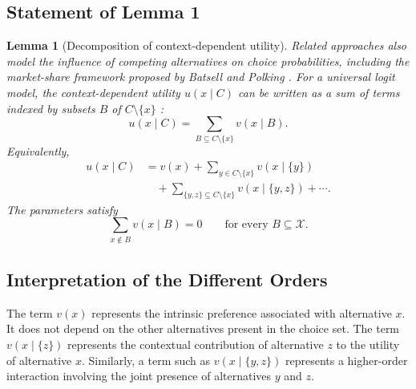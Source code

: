 \documentclass[12pt,oneside]{report}
\newtheorem{lemma}[definition]{Lemma}
\newcommand{\X}{\mathcal{X}}
\begin{document}
\subsection{Statement of Lemma 1}
\begin{lemma}[Decomposition of context-dependent utility]Related approaches also model the influence of competing
alternatives on choice probabilities, including the
market-share framework proposed by Batsell and Polking
\citep{batsell1985}.
For a universal logit model, the context-dependent utility $u(x\mid C)$ can
be written as a sum of terms indexed by subsets $B$ of
$C\setminus\{x\}$ \citep{seshadri2019}:
\begin{equation}
    u(x\mid C)
    =
    \sum_{B\subseteq C\setminus\{x\}}v(x\mid B).
    \label{eq:utility-decomposition}
\end{equation}
Equivalently,
\begin{equation}
\begin{split}
    u(x\mid C)
    &=
    v(x)
    +
    \sum_{y\in C\setminus\{x\}}v(x\mid\{y\}) \\
    &\quad+
    \sum_{\{y,z\}\subseteq C\setminus\{x\}}
    v(x\mid\{y,z\})
    +\cdots.
\end{split}
\end{equation}
The parameters satisfy
\begin{equation}
    \sum_{x\notin B}v(x\mid B)=0
    \qquad
    \text{for every } B\subseteq\X.
    \label{eq:decomposition-constraint}
\end{equation}
\end{lemma}
\subsection{Interpretation of the Different Orders}
The term $v(x)$ represents the intrinsic preference associated with
alternative $x$. It does not depend on the other alternatives present in the
choice set.
The term $v(x\mid\{z\})$ represents the contextual contribution of
alternative $z$ to the utility of alternative $x$. Similarly, a term such as
$v(x\mid\{y,z\})$ represents a higher-order interaction involving the joint
presence of alternatives $y$ and $z$.
\end{document}
